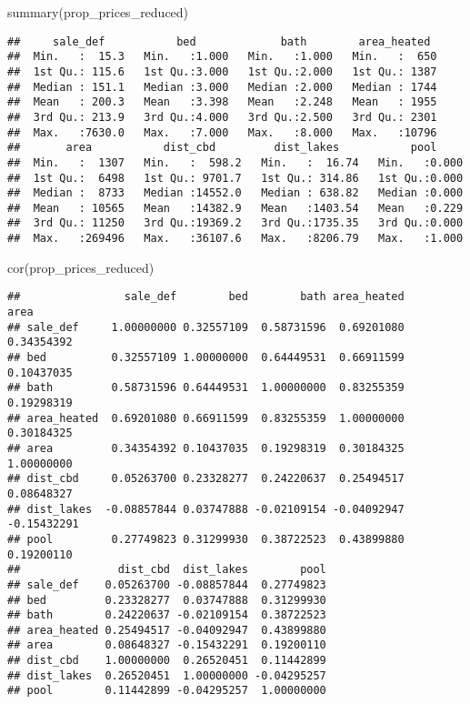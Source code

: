 \documentclass[
]{article}
\newenvironment{Shaded}{\begin{snugshade}}{\end{snugshade}}
\newcommand{\FunctionTok}[1]{\textcolor[rgb]{0.00,0.00,0.00}{#1}}
\newcommand{\NormalTok}[1]{#1}
\begin{document}
\begin{Shaded}
\begin{Highlighting}[]
\FunctionTok{summary}\NormalTok{(prop\_prices\_reduced)}
\end{Highlighting}
\end{Shaded}

\begin{verbatim}
##     sale_def           bed             bath        area_heated   
##  Min.   :  15.3   Min.   :1.000   Min.   :1.000   Min.   :  650  
##  1st Qu.: 115.6   1st Qu.:3.000   1st Qu.:2.000   1st Qu.: 1387  
##  Median : 151.1   Median :3.000   Median :2.000   Median : 1744  
##  Mean   : 200.3   Mean   :3.398   Mean   :2.248   Mean   : 1955  
##  3rd Qu.: 213.9   3rd Qu.:4.000   3rd Qu.:2.500   3rd Qu.: 2301  
##  Max.   :7630.0   Max.   :7.000   Max.   :8.000   Max.   :10796  
##       area           dist_cbd         dist_lakes           pool      
##  Min.   :  1307   Min.   :  598.2   Min.   :  16.74   Min.   :0.000  
##  1st Qu.:  6498   1st Qu.: 9701.7   1st Qu.: 314.86   1st Qu.:0.000  
##  Median :  8733   Median :14552.0   Median : 638.82   Median :0.000  
##  Mean   : 10565   Mean   :14382.9   Mean   :1403.54   Mean   :0.229  
##  3rd Qu.: 11250   3rd Qu.:19369.2   3rd Qu.:1735.35   3rd Qu.:0.000  
##  Max.   :269496   Max.   :36107.6   Max.   :8206.79   Max.   :1.000
\end{verbatim}

\begin{Shaded}
\begin{Highlighting}[]
\FunctionTok{cor}\NormalTok{(prop\_prices\_reduced)}
\end{Highlighting}
\end{Shaded}

\begin{verbatim}
##                sale_def        bed        bath area_heated        area
## sale_def     1.00000000 0.32557109  0.58731596  0.69201080  0.34354392
## bed          0.32557109 1.00000000  0.64449531  0.66911599  0.10437035
## bath         0.58731596 0.64449531  1.00000000  0.83255359  0.19298319
## area_heated  0.69201080 0.66911599  0.83255359  1.00000000  0.30184325
## area         0.34354392 0.10437035  0.19298319  0.30184325  1.00000000
## dist_cbd     0.05263700 0.23328277  0.24220637  0.25494517  0.08648327
## dist_lakes  -0.08857844 0.03747888 -0.02109154 -0.04092947 -0.15432291
## pool         0.27749823 0.31299930  0.38722523  0.43899880  0.19200110
##               dist_cbd  dist_lakes        pool
## sale_def    0.05263700 -0.08857844  0.27749823
## bed         0.23328277  0.03747888  0.31299930
## bath        0.24220637 -0.02109154  0.38722523
## area_heated 0.25494517 -0.04092947  0.43899880
## area        0.08648327 -0.15432291  0.19200110
## dist_cbd    1.00000000  0.26520451  0.11442899
## dist_lakes  0.26520451  1.00000000 -0.04295257
## pool        0.11442899 -0.04295257  1.00000000
\end{verbatim}
\end{document}
